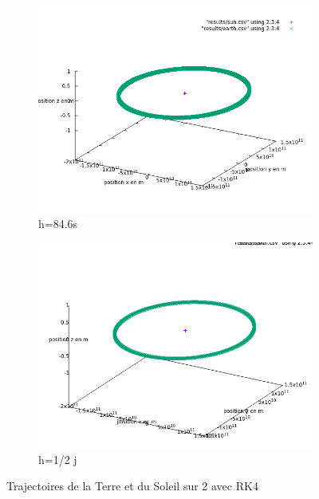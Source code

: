 \documentclass[11pt]{article}
\begin{document}
\begin{figure}[H]
\begin{subfigure}{0.5\textwidth}
\includegraphics[width=1\linewidth]{modelisations/h=60s/positions-terre-soleil.png} 
\caption{h=84.6s}
\label{fig:1subim1}
\end{subfigure}
\begin{subfigure}{0.5\textwidth}
\includegraphics[width=1\linewidth]{modelisations/h=0.5j/positio_terre_sun_0.5.png}
\caption{h=1/2 j}
\label{fig:1subim2}
\end{subfigure}

\caption{Trajectoires de la Terre et du Soleil sur 2 avec RK4}
\label{fig:image2}
\end{figure}
\end{document}
